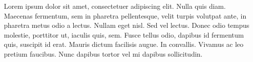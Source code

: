 Lorem ipsum dolor sit amet, consectetuer adipiscing elit. Nulla quis diam. Maecenas fermentum, sem in pharetra pellentesque, velit turpis volutpat ante, in pharetra metus odio a lectus. Nullam eget nisl. Sed vel lectus. Donec odio tempus molestie, porttitor ut, iaculis quis, sem. Fusce tellus odio, dapibus id fermentum quis, suscipit id erat. Mauris dictum facilisis augue. In convallis. Vivamus ac leo pretium faucibus. Nunc dapibus tortor vel mi dapibus sollicitudin.




